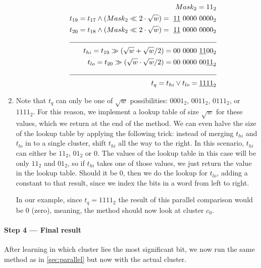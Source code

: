 \begin{enumerate}
\begin{enumerate}
        \begin{align*}
            Mask_2 = 11_2&\\
            t_{19} = t_{17} \wedge (Mask_2 \ll 2\cdot \sqrt{w}) =\ \underline{11}\ 0000\ 0000_2& \\
            t_{20} = t_{18} \wedge (Mask_2 \ll 2\cdot \sqrt{w}) =\ \underline{11}\ 0000\ 0000_2& \\
            \cline{1-2}
            t_{hi} = t_{19} \gg (\sqrt{w} + \sqrt{w}/2) = 00\ 0000\ \underline{11}00_2 &\\
            t_{lo} = t_{20} \gg (\sqrt{w} \cdot \sqrt{w} / 2) = 00\ 0000\ 00 \underline{11}_2 &\\
            \cline{1-2}
            t_{q} = t_{hi} \vee t_{lo} = \underline{1111}_2 &\\
        \end{align*}
    \end{enumerate}
    \item
    Note that $t_q$ can only be one of $\sqrt{w}$ possibilities: $0001_2$, $0011_2$, $0111_2$, or $1111_2$. For this reason, we implement a lookup table of size $\sqrt{w}$ for these values, which we return at the end of the method. We can even halve the size of the lookup table by applying the following trick: instead of merging $t_{hi}$ and $t_{lo}$ in to a single cluster, shift $t_{hi}$ all the way to the right. In this scenario, $t_{hi}$ can either be $11_2$, $01_2$ or $0$. The values of the lookup table in this case will be only $11_2$ and $01_2$, so if $t_{hi}$ takes one of those values, we just return the value in the lookup table. Should it be $0$, then we do the lookup for $t_{lo}$, adding a constant to that result, since we index the bits in a word from left to right.
    
    In our example, since $t_{q} = 1111_2$ the result of this parallel comparison would be $0$ (zero), meaning, the method should now look at cluster $c_0$.
\end{enumerate}

\paragraph{Step 4 --- Final result}
After learning in which cluster lies the most significant bit, we now run the same method as in \ref{sec:parallel} but now with the actual cluster.

